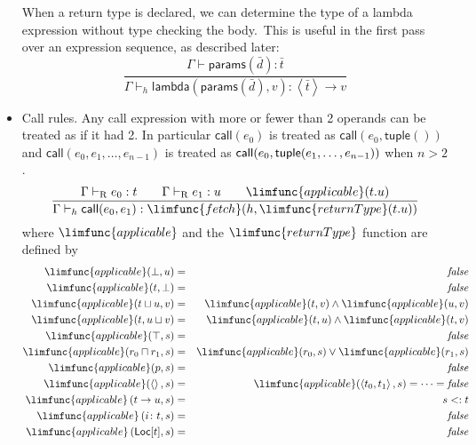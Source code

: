 \documentclass[12pt]{article}
\begin{document}
\begin{itemize}
When a return type is declared, we can determine the type of a lambda
expression without type checking the body.\ This is useful in the first pass
over an expression sequence, as described later:%
\begin{equation*}
\frac{\Gamma \vdash \mathsf{params}(\bar{d}):\bar{t}}{\Gamma \vdash _{h}%
\mathsf{lambda}(\mathsf{params}(\bar{d}),v):\left\langle \bar{t}%
\right\rangle \rightarrow v}
\end{equation*}

\item Call rules. Any call expression with more or fewer than 2 operands can
be treated as if it had 2. In particular $\mathsf{call}(e_{0})$ is treated
as $\mathsf{call}(e_{0},\mathsf{tuple}())$ and $\mathsf{call}%
(e_{0},e_{1},\ldots ,e_{n-1})$ is treated as $\mathsf{call}(e_{0},\mathsf{%
tuple}(e_{1},\ldots ,e_{n-1}))$ when $n>2$.%
\begin{equation*}
\frac{\Gamma \vdash _{\mathrm{R}}e_{0}:t\qquad \Gamma \vdash _{\mathrm{R}%
}e_{1}:u\qquad \limfunc{applicable}(t.u)}{\Gamma \vdash _{h}\mathsf{call}%
(e_{0},e_{1}):\limfunc{fetch}(h,\limfunc{returnType}(t.u))}
\end{equation*}%
where $\limfunc{applicable}$ and the $\limfunc{returnType}$ function are
defined by%
\begin{eqnarray*}
\limfunc{applicable}(\bot ,u) &=&\mathit{false} \\
\limfunc{applicable}(t,\bot ) &=&\mathit{false} \\
\limfunc{applicable}(t\sqcup u,v) &=&\limfunc{applicable}(t,v)\wedge 
\limfunc{applicable}(u,v) \\
\limfunc{applicable}(t,u\sqcup v) &=&\limfunc{applicable}(t,u)\wedge 
\limfunc{applicable}(t,v) \\
\limfunc{applicable}(\top ,s) &=&\mathit{false} \\
\limfunc{applicable}(r_{0}\sqcap r_{1},s) &=&\limfunc{applicable}%
(r_{0},s)\vee \limfunc{applicable}(r_{1},s) \\
\limfunc{applicable}(p,s) &=&\mathit{false} \\
\limfunc{applicable}(\left\langle {}\right\rangle ,s) &=&\limfunc{applicable}%
(\left\langle t_{0},t_{1}\right\rangle ,s)=\cdots =\mathit{false} \\
\limfunc{applicable}\left( t\rightarrow u,s\right)  &=&s<:t \\
\limfunc{applicable}\left( i\colon t,s\right)  &=&\mathit{false} \\
\limfunc{applicable}\left( \mathsf{Loc}[t],s\right)  &=&\mathit{false}

\end{eqnarray*}
\end{itemize}
\end{document}
